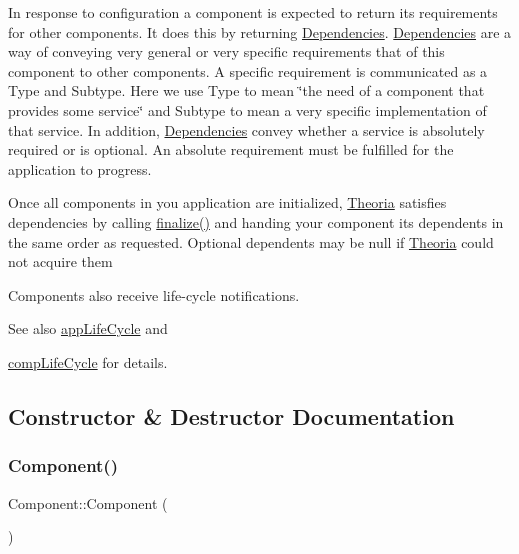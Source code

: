 In response to configuration a component is expected to return its requirements for other components. It does this by returning \hyperlink{classtheoria_1_1core_1_1Dependencies}{Dependencies}. \hyperlink{classtheoria_1_1core_1_1Dependencies}{Dependencies} are a way of conveying very general or very specific requirements that of this component to other components. A specific requirement is communicated as a Type and Subtype. Here we use Type to mean \char`\"{}the need of a component that provides some service\char`\"{} and Subtype to mean a very specific implementation of that service. In addition, \hyperlink{classtheoria_1_1core_1_1Dependencies}{Dependencies} convey whether a service is absolutely required or is optional. An absolute requirement must be fulfilled for the application to progress.

Once all components in you application are initialized, \hyperlink{classtheoria_1_1core_1_1Theoria}{Theoria} satisfies dependencies by calling \hyperlink{classtheoria_1_1core_1_1Component_afd8acc89e2cd36e92bebe7e6fa530764}{finalize()} and handing your component its dependents in the same order as requested. Optional dependents may be null if \hyperlink{classtheoria_1_1core_1_1Theoria}{Theoria} could not acquire them

Components also receive life-\/cycle notifications. \begin{DoxySeeAlso}{See also}
\hyperlink{classtheoria_1_1core_1_1Component_ae036cde9b803a621149efeff7e0e00fc}{app\+Life\+Cycle} and 

\hyperlink{classtheoria_1_1core_1_1Component_a92578e2b6253681a21b91e7c22b22975}{comp\+Life\+Cycle} for details. 
\end{DoxySeeAlso}


\subsection{Constructor \& Destructor Documentation}
\mbox{\label{classtheoria_1_1core_1_1Component_a8775db6d1a2c1afc2e77cd3c8f39da6f}} 
\subsubsection{\texorpdfstring{Component()}{Component()}\hspace{0.1cm}{\footnotesize\ttfamily [1/3]}}
{\footnotesize\ttfamily Component\+::\+Component (\begin{DoxyParamCaption}{ }\end{DoxyParamCaption})}

